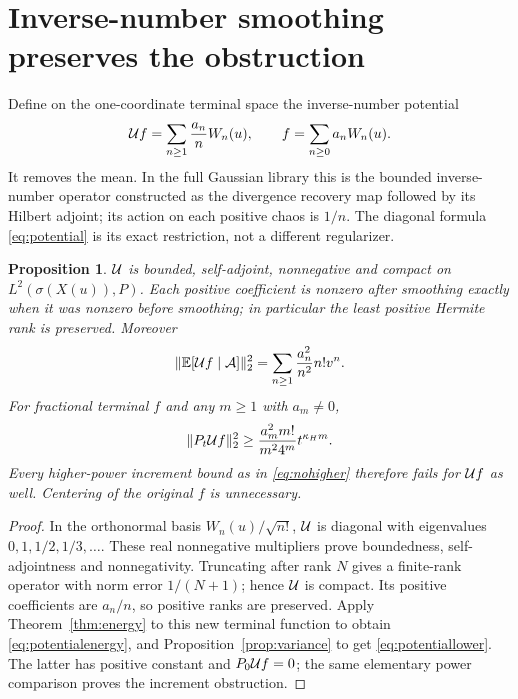 \documentclass[11pt]{article}
\newtheorem{proposition}[theorem]{Proposition}
\begin{document}
\section{Inverse-number smoothing preserves the obstruction}
Define on the one-coordinate terminal space the inverse-number potential
\begin{equation}\label{eq:potential}
 \mathcal U f=\sum_{n\geq1}\frac{a_n}{n}W_n(u),\qquad
 f=\sum_{n\geq0}a_nW_n(u).
\end{equation}
It removes the mean. In the full Gaussian library this is the bounded
inverse-number operator constructed as the divergence recovery map
followed by its Hilbert adjoint; its action on each positive chaos is
$1/n$. The diagonal formula \eqref{eq:potential} is its exact
restriction, not a different regularizer.

\begin{proposition}\label{prop:potential}
$\mathcal U$ is bounded, self-adjoint, nonnegative and compact on
$L^2(\sigma(X(u)),P)$. Each positive coefficient is nonzero after
smoothing exactly when it was nonzero before smoothing; in particular
the least positive Hermite rank is preserved. Moreover
\begin{equation}\label{eq:potentialenergy}
 \|\mathbb E[\mathcal U f\mid\mathcal A]\|_2^2
 =\sum_{n\geq1}\frac{a_n^2}{n^2}n!v^n.
\end{equation}
For fractional terminal $f$ and any $m\geq1$ with $a_m\ne0$,
\begin{equation}\label{eq:potentiallower}
 \|P_t\mathcal U f\|_2^2\geq\frac{a_m^2m!}{m^24^m}t^{\kappa_Hm}.
\end{equation}
Every higher-power increment bound as in \eqref{eq:nohigher} therefore
fails for $\mathcal U f$ as well. Centering of the original $f$ is unnecessary.
\end{proposition}
\begin{proof}
In the orthonormal basis $W_n(u)/\sqrt{n!}$, $\mathcal U$ is diagonal with
eigenvalues $0,1,1/2,1/3,\ldots$. These real nonnegative multipliers
prove boundedness, self-adjointness and nonnegativity. Truncating after
rank $N$ gives a finite-rank operator with norm error $1/(N+1)$;
hence $\mathcal U$ is compact. Its positive coefficients are $a_n/n$, so
positive ranks are preserved. Apply Theorem~\ref{thm:energy} to this
new terminal function to obtain \eqref{eq:potentialenergy}, and
Proposition~\ref{prop:variance} to get \eqref{eq:potentiallower}.
The latter has positive constant and $P_0\mathcal U f=0$; the same elementary
power comparison proves the increment obstruction.
\end{proof}
\end{document}
